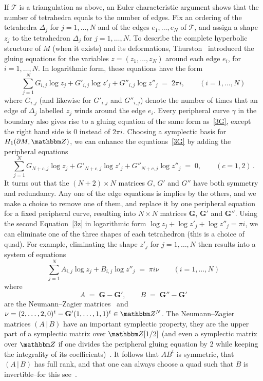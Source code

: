 \documentclass[12pt,reqno]{amsart}
\theoremstyle{definition}
\def\BZ{\mathbbm Z}
\def\calT{\mathcal T}
\def\be{\begin{equation}}
\def\ee{\end{equation}}
\renewcommand{\=}{\;=\;}
\begin{document}
If $\calT$ is a triangulation as above, an Euler characteristic argument shows
that the number of tetrahedra equals to the number of edges. Fix an ordering
of the tetrahedra $\Delta_j$ for $j=1,\dots,N$ and of the edges $e_1,\dots,e_N$
of $\calT$, and assign a shape $z_j$ to the tetrahedron $\Delta_j$ for $j=1,\dots,N$.
To describe the complete hyperbolic structure of $M$ (when it exists) and its
deformations, Thurston~\cite{Th} introduced the gluing equations
for the variables $z=(z_1,\dots,z_N)$ 
around each edge $e_i$, for $i=1,\dots, N$. In logarithmic form, these equations
have the form
\be
\label{3G}
\sum_{j=1}^N G_{i,j} \log z_j + G'_{i,j} \log z'_j + G''_{i,j} \log z''_j \= 2 \pi i,
\qquad (i=1, \dots, N)
\ee
where $G_{i,j}$ (and likewise for $G'_{i,j}$ and $G''_{i,j}$) denote the number
of times that an edge of $\Delta_j$ labelled $z_j$ winds around the edge $e_i$.
Every peripheral curve $\gamma$ in the boundary also gives rise to a gluing
equation of the same form as~\eqref{3G}, except the right hand side is $0$
instead of $2 \pi i$. Choosing a symplectic basis for $H_1(\partial M,\BZ)$, we
can enhance the equations~\eqref{3G} by adding the peripheral equations
\be
\label{3Gb}
\sum_{j=1}^N G_{N+c,j} \log z_j + G'_{N+c,j} \log z'_j + G''_{N+c,j} \log z''_j
\= 0, \qquad (c=1,2) \,.
\ee
It turns out that the $(N+2) \times N$ matrices $G$, $G'$ and $G''$ have both
symmetry and redundancy. Any one of the edge equations is implies by the others,
and we make a choice to remove one of them, and replace it by one peripheral
equation for a fixed peripheral curve, resulting into $N \times N$ matrices
$\mathbf G$, $\mathbf G'$ and $\mathbf G''$. Using the second
Equation~\eqref{3z} in logarithmic form $\log z_j + \log z'_j + \log z''_j = \pi i$,
we can eliminate one of the three shapes of each tetrahedron (this is a choice of
quad). For example, eliminating the shape $z'_j$ for $j=1,\dots,N$ then results
into a system of equations
\be
\label{3Gc}
\sum_{j=1}^N A_{i,j} \log z_j + B_{i,j} \log z''_j \= \pi i \nu
\qquad (i=1, \dots, N)
\ee
where
\be
\label{AB}
A \= \mathbf G - \mathbf G', \qquad B \= \mathbf G'' - \mathbf G'
\ee
are the Neumann--Zagier matrices~\cite{NZ} and
$\nu = (2,\dots,2,0)^t -\mathbf G' (1,\dots,1,1)^t \in \BZ^N$.
The Neumann--Zagier matrices $(A\,| \,B)$ have an important symplectic property,
they are the upper part of a symplectic matrix over $\BZ[1/2]$ (and even a symplectic
matrix over $\BZ$ if one divides the peripheral gluing equation by 2 while keeping
the integrality of its coefficients)~\cite{NZ}. It follows that $A B^t$ is
symmetric, that $(A \,|\, B)$ has full rank, and that one can always choose a
quad such that $B$ is invertible--for this see~\cite[Lem.A.3]{DG}.
\end{document}
